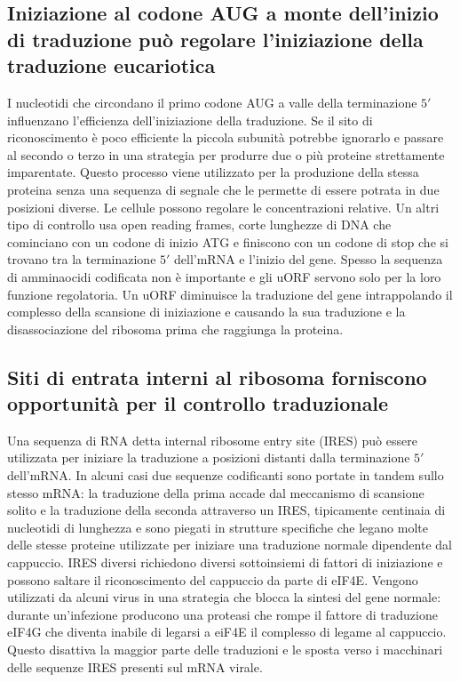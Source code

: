 \subsection{Iniziazione al codone AUG a monte dell'inizio di traduzione pu\`o regolare l'iniziazione della traduzione eucariotica}
I nucleotidi che circondano il primo codone AUG a valle della terminazione $5'$ influenzano l'efficienza dell'iniziazione della traduzione. Se il sito di riconoscimento \`e poco 
efficiente la piccola subunit\`a potrebbe ignorarlo e passare al secondo o terzo in una strategia per produrre due o pi\`u proteine strettamente imparentate. Questo processo viene 
utilizzato per la produzione della stessa proteina senza una sequenza di segnale che le permette di essere potrata in due posizioni diverse. Le cellule possono regolare le concentrazioni
relative. Un altri tipo di controllo usa open reading frames, corte lunghezze di DNA che cominciano con un codone di inizio ATG e finiscono con un codone di stop che si trovano tra
la terminazione $5'$ dell'mRNA e l'inizio del gene. Spesso la sequenza di amminaocidi codificata non \`e importante e gli uORF servono solo per la loro funzione regolatoria. Un uORF 
diminuisce la traduzione del gene intrappolando il complesso della scansione di iniziazione e causando la sua traduzione e la disassociazione del ribosoma prima che raggiunga la 
proteina.
\subsection{Siti di entrata interni al ribosoma forniscono opportunit\`a per il controllo traduzionale}
Una sequenza di RNA detta internal ribosome entry site (IRES) pu\`o essere utilizzata per iniziare la traduzione a posizioni distanti dalla terminazione $5'$ dell'mRNA. In alcuni casi
due sequenze codificanti sono portate in tandem sullo stesso mRNA: la traduzione della prima accade dal meccanismo di scansione solito e la traduzione della seconda attraverso un IRES, 
tipicamente centinaia di nucleotidi di lunghezza e sono piegati in strutture specifiche che legano molte delle stesse proteine utilizzate per iniziare una traduzione normale dipendente
dal cappuccio. IRES diversi richiedono diversi sottoinsiemi di fattori di iniziazione e possono saltare il riconoscimento del cappuccio da parte di eIF4E. Vengono utilizzati da 
alcuni virus in una strategia che blocca la sintesi del gene normale: durante un'infezione producono una proteasi che rompe il fattore di traduzione eIF4G che diventa inabile di 
legarsi a eiF4E il complesso di legame al cappuccio. Questo disattiva la maggior parte delle traduzioni e le sposta verso i macchinari delle sequenze IRES presenti sul mRNA virale. 
